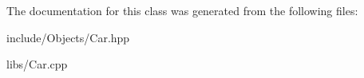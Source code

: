 The documentation for this class was generated from the following files\+:\begin{DoxyCompactItemize}
\item 
include/\+Objects/Car.\+hpp\item 
libs/Car.\+cpp\end{DoxyCompactItemize}

